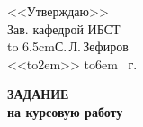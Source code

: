 \hfill\parbox{6.5cm}{<<Утверждаю>>\\
  Зав. кафедрой ИБСТ\\
  \hbox to 6.5cm{\hrulefill С.\,Л.\,Зефиров}\\
  \def\hrf#1{\hbox to#1{\hrulefill}}
  <<\hrf{2em}>> \hrf{6em} \the\year~г.}	
	
\begin{center}\textbf{\normalfont\bfseries\large ЗАДАНИЕ}\\\textbf{на
    курсовую работу}\end{center}

\newpage

